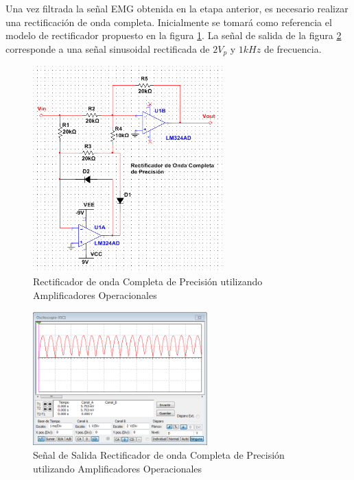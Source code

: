 Una vez filtrada la señal EMG obtenida en la etapa anterior, es necesario realizar una rectificación de onda completa. Inicialmente se tomará como referencia el modelo de rectificador propuesto en la figura \ref{rect_opamp}. La señal de salida de la figura \ref{osc_rect_opamp} corresponde a una señal sinusoidal rectificada de $2V_p$ y $1kHz$ de frecuencia.


\begin{figure}[H]
  \centering
  \includegraphics[width=0.65\textwidth]{Capitulo_2/op_amp_rectifier.png}
  \caption{Rectificador de onda Completa de Precisión utilizando Amplificadores Operacionales}
  \label{rect_opamp}
\end{figure}


\begin{figure}[H]
  \centering
  \includegraphics[width=0.6\textwidth]{Capitulo_2/osc_op_amp_rectifier.png}
  \caption{Señal de Salida Rectificador de onda Completa de Precisión utilizando Amplificadores Operacionales}
  \label{osc_rect_opamp}
\end{figure}